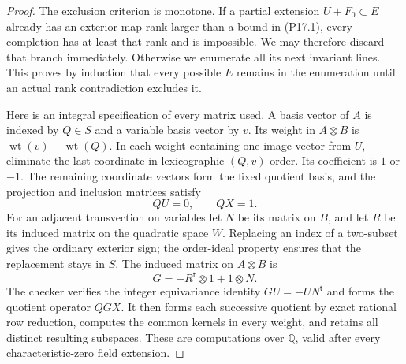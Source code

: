 \begin{proof}
The exclusion criterion is monotone. If a partial extension
$U+F_0\subset E$ already has an exterior-map rank larger than a bound
in (P17.1), every completion has at least that rank and is impossible.
We may therefore discard that branch immediately. Otherwise we
enumerate all its next invariant lines. This proves by induction that
every possible $E$ remains in the enumeration until an actual rank
contradiction excludes it.

Here is an integral specification of every matrix used. A basis
vector of $A$ is indexed by $Q\in S$ and a variable basis vector by
$v$. Its weight in $A\otimes B$ is
$\operatorname{wt}(v)-\operatorname{wt}(Q)$. In each weight containing
one image vector from $U$, eliminate the last coordinate in
lexicographic $(Q,v)$ order. Its coefficient is $1$ or $-1$. The
remaining coordinate vectors form the fixed quotient basis, and the
projection and inclusion matrices satisfy
\[
 QU=0,\qquad QX=1.
\]
For an adjacent transvection on variables let $N$ be its matrix on
$B$, and let $R$ be its induced matrix on the quadratic space $W$.
Replacing an index of a two-subset gives the ordinary exterior sign;
the order-ideal property ensures that the replacement stays in $S$.
The induced matrix on $A\otimes B$ is
\[
 G=-R^{\mathsf t}\otimes1+1\otimes N.
\]
The checker verifies the integer equivariance identity
$GU=-UN^{\mathsf t}$ and forms the quotient operator $QGX$.
It then forms each successive quotient by exact rational row
reduction, computes the common kernels in every weight, and retains
all distinct resulting subspaces. These are computations over
$\mathbb Q$, valid after every characteristic-zero field extension.


\end{proof}
